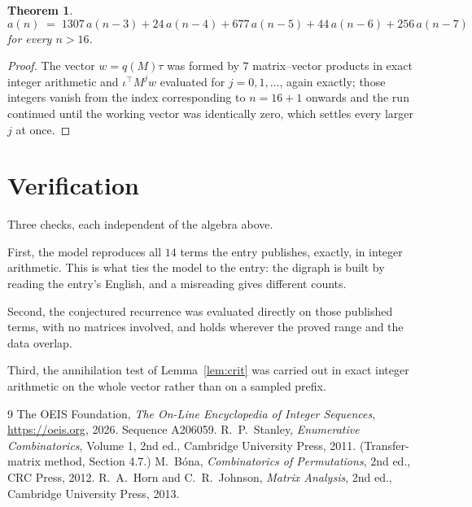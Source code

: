 \documentclass[11pt,a4paper]{article}
\theoremstyle{plain}
\newtheorem{theorem}{Theorem}
\theoremstyle{definition}
\begin{document}
\begin{theorem}
\[
a(n)\;=\;1307\,a(n-3) + 24\,a(n-4) + 677\,a(n-5) + 44\,a(n-6) + 256\,a(n-7)
\]
for every $n>16$.
\end{theorem}

\begin{proof}
The vector $w=q(M)\tau$ was formed by $7$ matrix--vector products in exact integer
arithmetic and $\iota^{\!\top}M^{j}w$ evaluated for $j=0,1,\dots$, again exactly; those
integers vanish from the index corresponding to $n=16+1$ onwards and the run continued
until the working vector was identically zero, which settles every larger $j$ at once.
\end{proof}

\section{Verification}

Three checks, each independent of the algebra above.

First, the model reproduces all $14$ terms the entry publishes, exactly, in integer
arithmetic. This is what ties the model to the entry: the digraph is built by reading the
entry's English, and a misreading gives different counts.

Second, the conjectured recurrence was evaluated directly on those published terms, with no
matrices involved, and holds wherever the proved range and the data overlap.

Third, the annihilation test of Lemma~\ref{lem:crit} was carried out in exact integer
arithmetic on the whole vector rather than on a sampled prefix.

\begin{thebibliography}{9}
 The OEIS Foundation, \emph{The On-Line Encyclopedia of Integer
Sequences}, \url{https://oeis.org}, 2026. Sequence A206059.
 R.~P.~Stanley, \emph{Enumerative Combinatorics}, Volume 1, 2nd ed.,
Cambridge University Press, 2011. (Transfer-matrix method, Section 4.7.)
 M.~B\'ona, \emph{Combinatorics of Permutations}, 2nd ed., CRC
Press, 2012.
 R.~A.~Horn and C.~R.~Johnson, \emph{Matrix Analysis}, 2nd ed., Cambridge
University Press, 2013.
\end{thebibliography}
\end{document}
